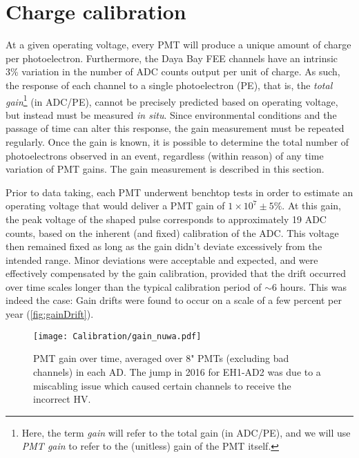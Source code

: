 \documentclass[../thesis.tex]{subfiles}
\begin{document}
\section{Charge calibration}
\label{sec:calibGain}

At a given operating voltage, every PMT will produce a unique amount of charge per photoelectron. Furthermore, the Daya Bay FEE channels have an intrinsic 3\% variation in the number of ADC counts output per unit of charge. As such, the response of each channel to a single photoelectron (PE), that is, the \emph{total gain}\footnote{Here, the term \emph{gain} will refer to the total gain (in ADC/PE), and we will use \emph{PMT gain} to refer to the (unitless) gain of the PMT itself.} (in ADC/PE), cannot be precisely predicted based on operating voltage, but instead must be measured \emph{in situ}. Since environmental conditions and the passage of time can alter this response, the gain measurement must be repeated regularly. Once the gain is known, it is possible to determine the total number of photoelectrons observed in an event, regardless (within reason) of any time variation of PMT gains. The gain measurement is described in this section.

Prior to data taking, each PMT underwent benchtop tests in order to estimate an operating voltage that would deliver a PMT gain of $1 \times 10^7 \pm 5\%$. At this gain, the peak voltage of the shaped pulse corresponds to approximately 19 ADC counts, based on the inherent (and fixed) calibration of the ADC. This voltage then remained fixed as long as the gain didn't deviate excessively from the intended range. Minor deviations were acceptable and expected, and were effectively compensated by the gain calibration, provided that the drift occurred over time scales longer than the typical calibration period of $\sim$6 hours. This was indeed the case: Gain drifts were found to occur on a scale of a few percent per year (\autoref{fig:gainDrift}).

\begin{figure}[h]
  \texttt{[image: Calibration/gain\_nuwa.pdf]}
  \caption{PMT gain over time, averaged over 8" PMTs (excluding bad channels) in each AD. The jump in 2016 for EH1-AD2 was due to a miscabling issue which caused certain channels to receive the incorrect HV.}
  \label{fig:gainDrift}
\end{figure}
\end{document}
